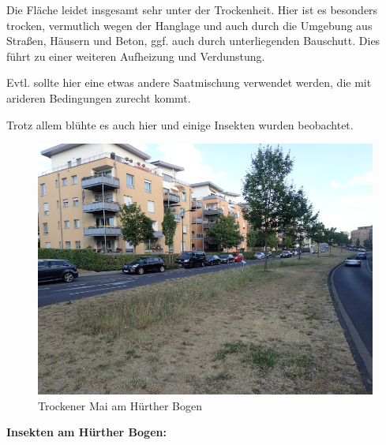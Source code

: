 \documentclass[10pt]{article}
\begin{document}
Die Fläche leidet insgesamt sehr unter der Trockenheit.
Hier ist es besonders trocken, vermutlich wegen der Hanglage und auch durch die Umgebung aus Straßen, Häusern und Beton, ggf. auch durch unterliegenden Bauschutt. Dies führt zu einer weiteren Aufheizung und Verdunstung.

Evtl. sollte hier eine etwas andere Saatmischung verwendet werden, die mit arideren Bedingungen zurecht kommt.

Trotz allem blühte es auch hier und einige Insekten wurden beobachtet. 

\begin{figure}[h!]
  \centering
  \includegraphics[width=0.45\linewidth]{img/bogen/mai.jpg}
  \caption{Trockener Mai am Hürther Bogen}
  \label{fig:trockener-mai}
\end{figure}


\clearpage
\textbf{Insekten am Hürther Bogen:}
\end{document}

